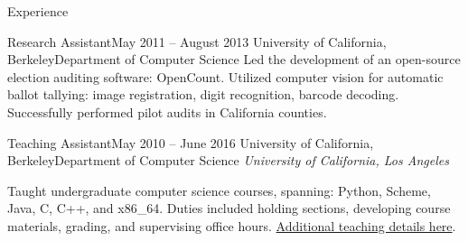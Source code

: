 \documentclass{resume}
\begin{document}
\begin{component}{Experience}
\vspace{-0.75em}

	\begin{position}{Research Assistant}{May 2011 -- August 2013}
	 	{University of California, Berkeley}{Department of Computer Science}
	{Led the development of an open-source election auditing software: OpenCount.
     Utilized computer vision for automatic ballot tallying: image registration, digit recognition, barcode decoding.
     Successfully performed
         pilot audits in California counties.
}
	\end{position}

\vspace{-0.25em}

	\begin{position}{Teaching Assistant}{May 2010 -- June 2016}
		{University of California, Berkeley}{Department of Computer Science}
    \emph{University of California, Los Angeles}

	{Taught undergraduate computer science courses, spanning: Python, Scheme, Java, C, C++, and x86\_64.
	  Duties included holding sections, developing course materials, grading, and supervising office hours.
      \href{http://eric-kim.net/eric-kim-net/teaching.html}{Additional teaching details here}.
    }
	\end{position}
\end{component}

\vspace{-1.0em}
\end{document}
